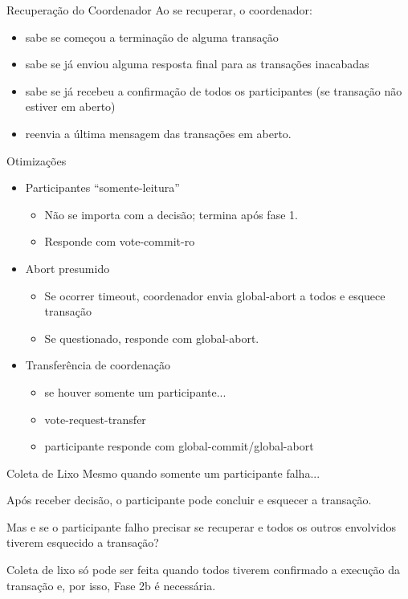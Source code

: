 \begin{frame}{Recuperação do Coordenador}
	Ao se recuperar, o coordenador:
	\begin{itemize}
		\item sabe se começou a terminação de alguma transação
		\item sabe se já enviou alguma resposta final para as transações inacabadas
		\item sabe se já recebeu a confirmação de todos os participantes (se transação não estiver em aberto)
		\item reenvia a última mensagem das transações em aberto.
	\end{itemize}
\end{frame}

\begin{frame}{Otimizações}
	\begin{itemize}
		\item Participantes ``somente-leitura''
			\begin{itemize}
				\item Não se importa com a decisão; termina após fase 1.
				\item Responde com vote-commit-ro
			\end{itemize} 
		\item Abort presumido
			\begin{itemize}
				\item Se ocorrer timeout, coordenador envia global-abort a todos e esquece transação
				\item Se questionado, responde com global-abort.
			\end{itemize}
		\item Transferência de coordenação
			\begin{itemize}
				\item se houver somente um participante...
				\item vote-request-transfer
				\item participante responde com global-commit/global-abort
			\end{itemize} 
	\end{itemize}
\end{frame}

\begin{frame}{Coleta de Lixo}
Mesmo quando somente um participante falha...

Após receber decisão, o participante pode concluir e esquecer a transação. 

Mas e se o participante falho precisar se recuperar e todos os outros envolvidos tiverem esquecido a transação?

\pause Coleta de lixo só pode ser feita quando todos tiverem confirmado a execução da transação e, por isso, Fase 2b é necessária.
\end{frame}


